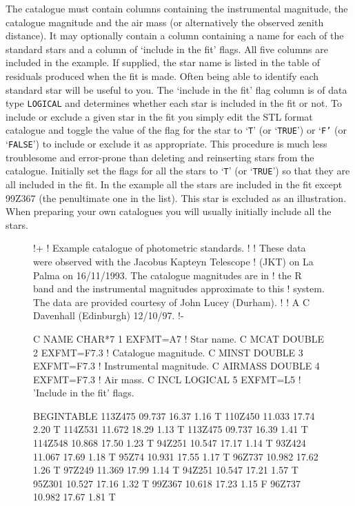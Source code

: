 \documentclass[twoside,11pt,nolof]{starlink}
\begin{document}
\begin{enumerate}
\begin{description}
     The catalogue must contain columns containing the instrumental magnitude,
     the catalogue magnitude and the air mass (or alternatively the observed
     zenith distance).  It may optionally contain a column containing a name
     for each of the standard stars and a column of `include in the fit'
     flags.  All five columns are included in the example.  If supplied, the
     star name is listed in the table of residuals produced when the fit is
     made.  Often being able to identify each standard star will be useful
     to you.  The `include in the fit' flag column is of data type \texttt{LOGICAL} and determines whether each star is included in the fit or
     not.  To include or exclude a given star in the fit you simply edit
     the STL format catalogue and toggle the value of the flag for the
     star to `\texttt{T}' (or `\texttt{TRUE}') or `\texttt{F'} (or `\texttt{FALSE}') to
     include or exclude it as appropriate.  This procedure is much less
     troublesome and error-prone than deleting and reinserting stars from
     the catalogue.  Initially set the flags for all the stars to `\texttt{T}'
     (or `\texttt{TRUE}') so that they are all included in the fit.  In the
     example all the stars are included in the fit except 99Z367 (the
     penultimate one in the list).  This star is excluded as an illustration.
     When preparing your own catalogues you will usually initially include all
     the stars.

\begin{figure}[htbp]

\begin{terminalv}
!+
! Example catalogue of photometric standards.
!
! These data were observed with the Jacobus Kapteyn Telescope
! (JKT) on La Palma on 16/11/1993.  The catalogue magnitudes are in
! the R band and the instrumental magnitudes approximate to this
! system.  The data are provided courtesy of John Lucey (Durham).
!
! A C Davenhall (Edinburgh) 12/10/97.
!-

C NAME    CHAR*7  1  EXFMT=A7    ! Star name.
C MCAT    DOUBLE  2  EXFMT=F7.3  ! Catalogue magnitude.
C MINST   DOUBLE  3  EXFMT=F7.3  ! Instrumental magnitude.
C AIRMASS DOUBLE  4  EXFMT=F7.3  ! Air mass.
C INCL    LOGICAL 5  EXFMT=L5    ! 'Include in the fit' flags.

BEGINTABLE
113Z475  09.737  16.37  1.16  T
110Z450  11.033  17.74  2.20  T
114Z531  11.672  18.29  1.13  T
113Z475  09.737  16.39  1.41  T
114Z548  10.868  17.50  1.23  T
 94Z251  10.547  17.17  1.14  T
 93Z424  11.067  17.69  1.18  T
 95Z74   10.931  17.55  1.17  T
 96Z737  10.982  17.62  1.26  T
 97Z249  11.369  17.99  1.14  T
 94Z251  10.547  17.21  1.57  T
 95Z301  10.527  17.16  1.32  T
 99Z367  10.618  17.23  1.15  F
 96Z737  10.982  17.67  1.81  T
\end{terminalv}


\end{figure}
\end{description}
\end{enumerate}
\end{document}
